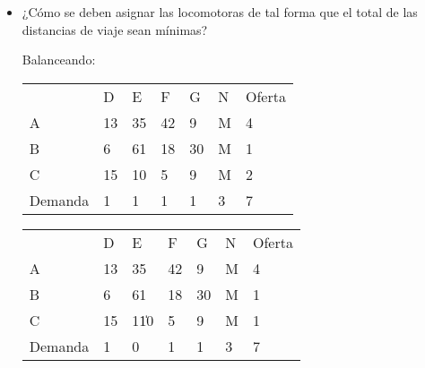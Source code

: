 \begin{itemize}
    \item ¿Cómo se deben asignar las locomotoras de tal forma que el total de
las distancias de viaje sean mínimas?

Balanceando:

\begin{tabular}{lllllll}
        & D & E & F & G & N & Oferta \\ \cline{2-6}
\multicolumn{1}{l|}{A} & \multicolumn{1}{l|}{13} & \multicolumn{1}{l|}{35} & \multicolumn{1}{l|}{42} & \multicolumn{1}{l|}{9} & \multicolumn{1}{l|}{M} & 4 \\ \cline{2-6}
\multicolumn{1}{l|}{B} & \multicolumn{1}{l|}{6}  & \multicolumn{1}{l|}{61} & \multicolumn{1}{l|}{18} & \multicolumn{1}{l|}{30} & \multicolumn{1}{l|}{M} & 1 \\ \cline{2-6}
\multicolumn{1}{l|}{C} & \multicolumn{1}{l|}{15} & \multicolumn{1}{l|}{10} & \multicolumn{1}{l|}{5}  & \multicolumn{1}{l|}{9}  & \multicolumn{1}{l|}{M} & 2 \\ \cline{2-6}
Demanda & 1 & 1 & 1 & 1 & 3 & 7     
\end{tabular}

\begin{tabular}{lllllll}
                       & D                       & E                       & F                       & G                       & N                      & Oferta \\ \cline{2-6}
\multicolumn{1}{l|}{A} & \multicolumn{1}{l|}{13} & \multicolumn{1}{l|}{35} & \multicolumn{1}{l|}{42} & \multicolumn{1}{l|}{9} & \multicolumn{1}{l|}{M} & 4      \\ \cline{2-6}
\multicolumn{1}{l|}{B} & \multicolumn{1}{l|}{6}  & \multicolumn{1}{l|}{61} & \multicolumn{1}{l|}{18} & \multicolumn{1}{l|}{30} & \multicolumn{1}{l|}{M} & 1      \\ \cline{2-6}
\multicolumn{1}{l|}{C} &
  \multicolumn{1}{l|}{15} &
  \multicolumn{1}{l|}{\cellcolor[HTML]{FE0000}1\|10} &
  \multicolumn{1}{l|}{5} &
  \multicolumn{1}{l|}{9} &
  \multicolumn{1}{l|}{M} &
  1 \\ \cline{2-6}
Demanda                & 1                       & 0                       & 1                       & 1                       & 3                      & 7     
\end{tabular}


\end{itemize}
